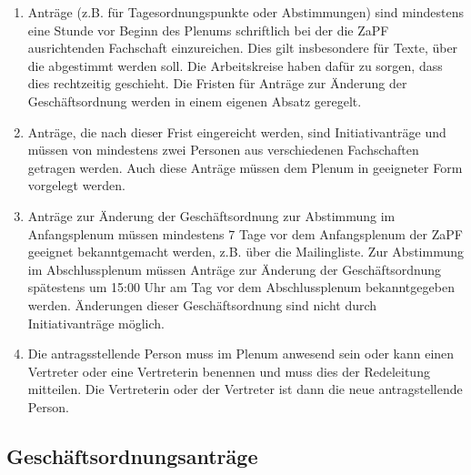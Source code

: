 \documentclass[draft,12pt,oneside]{scrreprt}
\begin{document}
\begin{enumerate}
\item Anträge (z.B. für Tagesordnungspunkte oder Abstimmungen) sind mindestens
      eine Stunde vor Beginn des Plenums schriftlich bei der die ZaPF
      ausrichtenden Fachschaft einzureichen.
      Dies gilt insbesondere für Texte, über die abgestimmt werden soll.
      Die Arbeitskreise haben dafür zu sorgen, dass dies rechtzeitig geschieht.
      Die Fristen für Anträge zur Änderung der Geschäftsordnung werden in einem
      eigenen Absatz geregelt.

\item Anträge, die nach dieser Frist eingereicht werden, sind Initiativanträge
      und müssen von mindestens zwei Personen aus verschiedenen Fachschaften
      getragen werden. Auch diese Anträge müssen dem Plenum in geeigneter Form
      vorgelegt werden.

\item Anträge zur Änderung der Geschäftsordnung zur Abstimmung im Anfangsplenum
      müssen mindestens 7 Tage vor dem Anfangsplenum der ZaPF geeignet
      bekanntgemacht werden, z.B. über die Mailingliste.
      Zur Abstimmung im Abschlussplenum müssen Anträge zur Änderung der
      Geschäftsordnung spätestens um 15:00 Uhr am Tag vor dem Abschlussplenum
      bekanntgegeben werden.
      Änderungen dieser Geschäftsordnung sind nicht durch Initiativanträge möglich.

\item Die antragsstellende Person muss im Plenum anwesend sein
      oder kann einen Vertreter oder eine Vertreterin benennen und muss dies
      der Redeleitung mitteilen.
      Die Vertreterin oder der Vertreter ist dann die neue antragstellende Person.
\end{enumerate}

\subsection{Geschäftsordnungsanträge}
\end{document}

